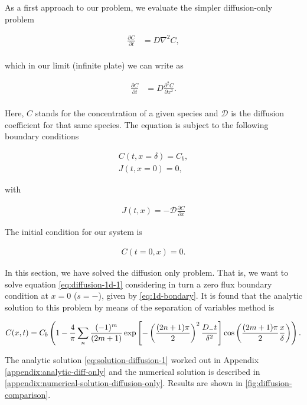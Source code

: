 As a first approach to our problem, we evaluate the simpler diffusion-only problem



\begin{align}
\frac{\partial C}{\partial t} &= D \nabla^2 C,\\
\label{eq:diffusion}
\end{align}

which in our limit (infinite plate) we can write as


\begin{align}
\label{eq:diffusion-1d-1}
\frac{\partial C}{\partial t} &= D\frac{\partial^2 C}{\partial x^2}.\\
\end{align}

Here, $C$ stands for the concentration of a given species and $\mathcal{D}$ is the diffusion coefficient for that same species. The equation is subject to the following boundary conditions

\begin{align}
	C(t, x = \delta) = C_b,\\
	J(t, x = 0) = 0,
\end{align}

with

\begin{align}
	J(t, x) =-\mathcal{D}\frac{\partial C}{\partial x} 
\end{align}

 The initial condition for our system is

\begin{align}
	C(t = 0, x) = 0.
\label{eq:diffusion-initial-condition--diffonly}
\end{align}

In this section, we have solved the diffusion only problem. That is, we want to solve equation \ref{eq:diffusion-1d-1} considering in turn a zero flux boundary condition at $x=0$ ($s=-$), given by \ref{eq:1d-bondary}. It is found that the analytic solution to this problem by means of the separation of variables method is

\begin{align}
	\label{eq:solution-diffusion-1}
	C(x,t) = C_b\left({1-\frac{4}{\pi} \sum_n \frac{(-1)^m}{(2m+1)}\exp\left[{-\left({\frac{(2n+1)\pi}{2}}\right)^2\frac{D_- t}{\delta^2}}\right]\cos\left({\frac{(2m+1)\pi}{2} \frac{x}{\delta}}\right)}\right).
\end{align}

The analytic solution \ref{eq:solution-diffusion-1} worked out in Appendix \ref{appendix:analytic-diff-only} and the numerical solution is described in \ref{appendix:numerical-solution-diffusion-only}. Results are shown in \ref{fig:diffusion-comparison}.

